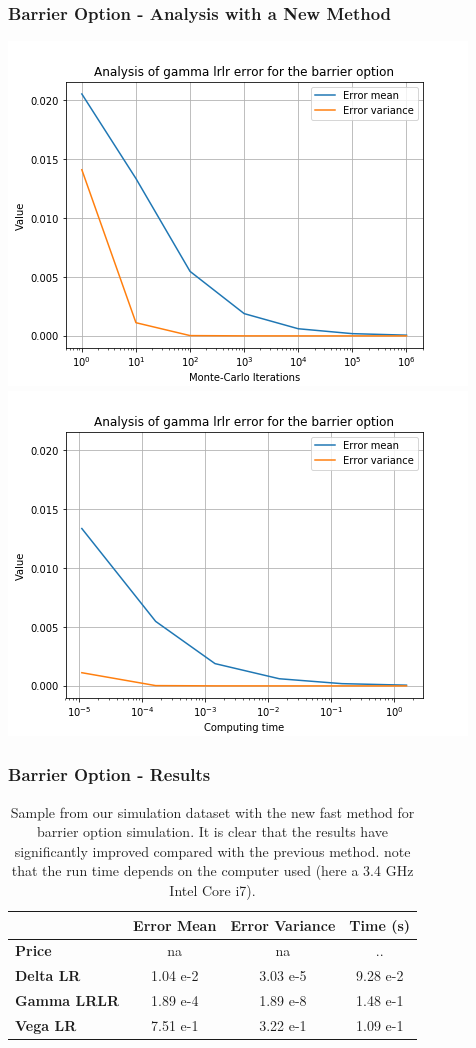 \documentclass[12pt]{beamer}
\begin{document}
\begin{frame}
\frametitle{Barrier Option - Analysis with a New Method}
\includegraphics[width=.5\textwidth]{graphs/barriergammalrlr.png}
\includegraphics[width=.5\textwidth]{graphs/barriergammalrlrtime.png}
\end{frame}

\begin{frame}
\frametitle{Barrier Option - Results}
\begin{table}
\centering
\begin{tabular}{|l|c|c|c|}
\hline
    & \textbf{Error Mean} & \textbf{Error Variance} & \textbf{Time (s)} \\ \hline
\textbf{Price} & na &          na         & .. \\ \hline
\textbf{Delta LR} & 1.04 e-2 & 3.03 e-5 & 9.28 e-2\\ \hline
\textbf{Gamma LRLR} & 1.89 e-4 & 1.89 e-8& 1.48 e-1\\ \hline
\textbf{Vega LR} & 7.51 e-1 & 3.22 e-1 & 1.09 e-1\\ \hline
\end{tabular}
\caption{Sample from our simulation dataset with the new fast method for barrier option simulation. It is clear that the results have significantly improved compared with the previous method. note that the run time depends on the computer used (here a 3.4 GHz Intel Core i7).}
\end{table}

\end{frame}
\end{document}
